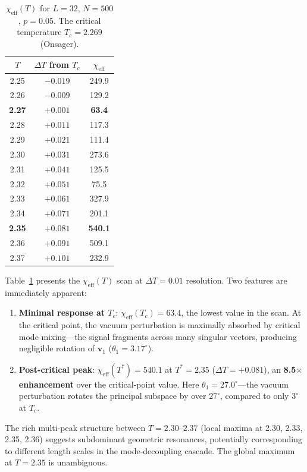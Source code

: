 \documentclass[aps,prl,twocolumn,superscriptaddress,byrevtex]{article}
\begin{document}
\begin{table}[t]
\centering
\caption{$\chi_{\text{eff}}(T)$ for $L=32$, $N=500$, $p=0.05$. The critical temperature $T_c = 2.269$ (Onsager).}
\label{tab:L32}
\begin{tabular}{ccc}
\toprule
$T$ & $\Delta T$ from $T_c$ & $\chi_{\text{eff}}$ \\
\midrule
2.25  & $-0.019$ & 249.9 \\
2.26  & $-0.009$ & 129.2 \\
\textbf{2.27} & \textbf{$+0.001$} & \textbf{63.4} \\
2.28  & $+0.011$ & 117.3 \\
2.29  & $+0.021$ & 111.4 \\
2.30  & $+0.031$ & 273.6 \\
2.31  & $+0.041$ & 125.5 \\
2.32  & $+0.051$ & 75.5  \\
2.33  & $+0.061$ & 327.9 \\
2.34  & $+0.071$ & 201.1 \\
\textbf{2.35} & \textbf{$+0.081$} & \textbf{540.1} \\
2.36  & $+0.091$ & 509.1 \\
2.37  & $+0.101$ & 232.9 \\
\bottomrule
\end{tabular}
\end{table}

Table~\ref{tab:L32} presents the $\chi_{\text{eff}}(T)$ scan at $\Delta T = 0.01$ resolution. Two features are immediately apparent:

\begin{enumerate}
\item \textbf{Minimal response at $T_c$}: $\chi_{\text{eff}}(T_c) = 63.4$, the lowest value in the scan. At the critical point, the vacuum perturbation is maximally absorbed by critical mode mixing---the signal fragments across many singular vectors, producing negligible rotation of $\mathbf{v}_1$ ($\theta_1 = 3.17^\circ$).

\item \textbf{Post-critical peak}: $\chi_{\text{eff}}(T^*) = 540.1$ at $T^* = 2.35$ ($\Delta T = +0.081$), an \textbf{8.5$\times$ enhancement} over the critical-point value. Here $\theta_1 = 27.0^\circ$---the vacuum perturbation rotates the principal subspace by over $27^\circ$, compared to only $3^\circ$ at $T_c$.
\end{enumerate}

The rich multi-peak structure between $T=2.30$--$2.37$ (local maxima at 2.30, 2.33, 2.35, 2.36) suggests subdominant geometric resonances, potentially corresponding to different length scales in the mode-decoupling cascade. The global maximum at $T=2.35$ is unambiguous.
\end{document}
